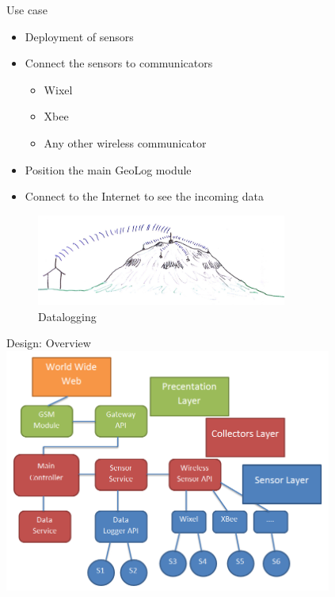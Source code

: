 \documentclass{beamer}
\begin{document}
\begin{frame}{Use case}
	\begin{itemize}
	\item Deployment of sensors
	\item Connect the sensors to communicators
		\begin{itemize}
		\item Wixel
		\item Xbee
		\item Any other wireless communicator
		\end{itemize}
	\item Position the main GeoLog module
	\item Connect to the Internet to see the incoming data
	\end{itemize}
	\begin{figure}
			\centering
	        \includegraphics[height=3cm]{graphics/GeoLog.PNG}
	        \caption{Datalogging\cite{Helgason2014}}
	\end{figure}

\end{frame}

\begin{frame}{Design: Overview}
\includegraphics[height=8cm]{graphics/softwareArchitecture.png}
\end{frame}
\end{document}
